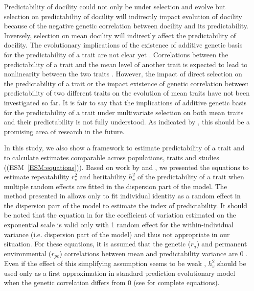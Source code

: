 \documentclass[a4paper,12pt,twoside]{article}
\begin{document}
	Predictability of docility could not only be under selection and evolve but selection on predictability of docility will indirectly impact evolution of docility because of the negative genetic correlation between docility and its predictability.
	Inversely, selection on mean docility will indirectly affect the predictability of docility.	
	The evolutionary implications of the existence of additive genetic basis for the predictability of a trait are not clear yet \citep{Mulder2015}.
	Correlations between the predictability of a trait and the mean level of another trait is expected to lead to nonlinearity between the two traits \citep{Mulder2015}.
	However, the impact of direct selection on the predictability of a trait or the impact existence of genetic correlation between predictability of two different traits on the evolution of mean traits have not been investigated so far.
	It is fair to say that the implications of additive genetic basis for the predictability of a trait under multivariate selection on both mean traits and their predictability is not fully understood.
	As indicated by \cite{Westneat2014}, this should be a promising area of research in the future.

	In this study, we also show a framework to estimate predictability of a trait and to calculate estimates comparable across populations, traits and studies ((ESM~\ref{ESM:equations})).
	Based on work by \cite{Mulder2007} and \cite{Sae-lim2015}, we presented the equations to estimate repeatability $r_v^2$ and heritability $h_v^2$ of  the predictability of a trait when multiple random effects are fitted in the dispersion part of the model. 
	The method presented in \cite{Cleasby2015} allows only to fit individual identity as a random effect in the dispersion part of the model to estimate the index of predictability.
	It should be noted that the equation in \cite{Cleasby2015} for the coefficient of variation estimated on the exponential scale is valid only with 1 random effect for the within-individual variance (i.e. dispersion part of the model) and thus not appropriate in our situation.
	For these equations, it is assumed that the genetic ($r_a$) and permanent environmental ($r_{pe}$) correlations between mean and predictability variance are 0 \citep{Mulder2007}.
	Even if the effect of this simplifying assumption seems to be weak \citep{Mulder2007, Sae-lim2015}, $h_v^2$ should be used only as a first approximation in standard prediction evolutionary model when the genetic correlation differs from 0 (see \cite{Mulder2007} for complete equations).
		
\end{document}
